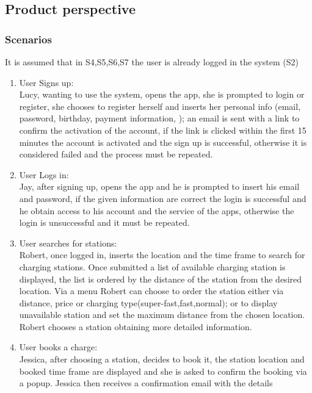 \subsection{Product perspective}

\subsubsection{Scenarios}
It is assumed that in S4,S5,S6,S7 the user is already logged in the system (S2)
\begin{enumerate}[label=\textbf{S\arabic*}]
      \item User Signs up:\\
            Lucy, wanting to use the system, opens the app, she is prompted to login or register,
            she chooses to register herself and inserts her personal info (email, password, birthday, payment information, );
            an email is sent with a link to confirm the activation of the account, if the link is clicked within
            the first 15 minutes the account is activated and the sign up is successful,
            otherwise it is considered failed and the process must be repeated.
      \item User Logs in:\\
            Jay, after signing up, opens the app and he is prompted to insert his email and password,
            if the given information are correct the login is successful and he obtain access to his account
            and the service of the apps, otherwise the login is unsuccessful and it must be repeated.
      \item User searches for stations:\\
            Robert, once logged in, inserts the location and the time frame to search for charging stations.
            Once submitted a list of available charging station is displayed, the list is ordered by the distance of the station
            from the desired location. Via a menu Robert can choose to order the station either via distance, price or charging type(super-fast,fast,normal);
            or to display unavailable station and set the maximum distance from the chosen location.
            Robert chooses a station obtaining more detailed information.
      \item User books a charge:\\
            Jessica, after choosing a station, decides to book it, the station location and booked time frame are displayed
            and she is asked to confirm the booking via a popup. Jessica then receives a confirmation email with the details

\end{enumerate}
